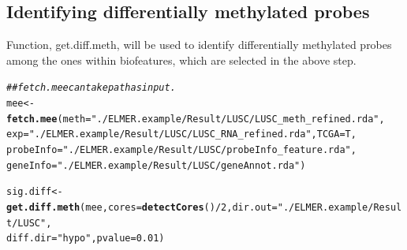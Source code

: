 \documentclass{article}\usepackage[]{graphicx}\usepackage[]{color}
\makeatletter
\newcommand{\hlnum}[1]{\textcolor[rgb]{0.686,0.059,0.569}{#1}}%
\newcommand{\hlstr}[1]{\textcolor[rgb]{0.192,0.494,0.8}{#1}}%
\newcommand{\hlcom}[1]{\textcolor[rgb]{0.678,0.584,0.686}{\textit{#1}}}%
\newcommand{\hlopt}[1]{\textcolor[rgb]{0,0,0}{#1}}%
\newcommand{\hlstd}[1]{\textcolor[rgb]{0.345,0.345,0.345}{#1}}%
\newcommand{\hlkwb}[1]{\textcolor[rgb]{0.69,0.353,0.396}{#1}}%
\newcommand{\hlkwc}[1]{\textcolor[rgb]{0.333,0.667,0.333}{#1}}%
\newcommand{\hlkwd}[1]{\textcolor[rgb]{0.737,0.353,0.396}{\textbf{#1}}}%
\newenvironment{kframe}{%
 \def\at@end@of@kframe{}%
 \ifinner\ifhmode%
  \def\at@end@of@kframe{\end{minipage}}%
  \begin{minipage}{\columnwidth}%
 \fi\fi%
 \def\FrameCommand##1{\hskip\@totalleftmargin \hskip-\fboxsep
 \colorbox{shadecolor}{##1}\hskip-\fboxsep
     \hskip-\linewidth \hskip-\@totalleftmargin \hskip\columnwidth}%
 \MakeFramed {\advance\hsize-\width
   \@totalleftmargin\z@ \linewidth\hsize
   \@setminipage}}%
 {\par\unskip\endMakeFramed%
 \at@end@of@kframe}
\newenvironment{knitrout}{}{} %
\makeatother
\begin{document}
\subsection{Identifying differentially methylated probes}
Function, get.diff.meth, will be used to identify differentially methylated 
probes among the ones within biofeatures, which are selected in the above step. 
\begin{knitrout}
\color{fgcolor}\begin{kframe}
\begin{alltt}
\hlcom{## fetch.mee can take path as input.}
\hlstd{mee} \hlkwb{<-} \hlkwd{fetch.mee}\hlstd{(}\hlkwc{meth}\hlstd{=}\hlstr{"./ELMER.example/Result/LUSC/LUSC_meth_refined.rda"}\hlstd{,}
                 \hlkwc{exp}\hlstd{=}\hlstr{"./ELMER.example/Result/LUSC/LUSC_RNA_refined.rda"}\hlstd{,} \hlkwc{TCGA}\hlstd{=T,}
                 \hlkwc{probeInfo}\hlstd{=}\hlstr{"./ELMER.example/Result/LUSC/probeInfo_feature.rda"}\hlstd{,}
                 \hlkwc{geneInfo}\hlstd{=}\hlstr{"./ELMER.example/Result/LUSC/geneAnnot.rda"}\hlstd{)}
\end{alltt}


{\ttfamily\noindent\itshape{}}\begin{alltt}
\hlstd{sig.diff} \hlkwb{<-} \hlkwd{get.diff.meth}\hlstd{(mee,} \hlkwc{cores}\hlstd{=}\hlkwd{detectCores}\hlstd{()}\hlopt{/}\hlnum{2}\hlstd{,} \hlkwc{dir.out} \hlstd{=}\hlstr{"./ELMER.example/Result/LUSC"}\hlstd{,}
                          \hlkwc{diff.dir}\hlstd{=}\hlstr{"hypo"}\hlstd{,} \hlkwc{pvalue} \hlstd{=} \hlnum{0.01}\hlstd{)}


\end{alltt}
\end{kframe}
\end{knitrout}
\end{document}
